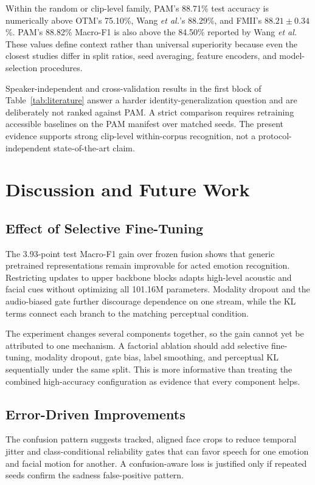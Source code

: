 \documentclass[conference]{IEEEtran}
\begin{document}
Within the random or clip-level family, PAM's 88.71\% test accuracy is
numerically above OTM's 75.10\%, Wang \emph{et al.}'s 88.29\%, and FMII's
$88.21\pm0.34$\%. PAM's 88.82\%
Macro-F1 is also above the 84.50\% reported by Wang \emph{et al.} These
values define context rather than universal superiority because even the
closest studies differ in split ratios, seed averaging, feature encoders, and
model-selection procedures.

Speaker-independent and cross-validation results in the first block of
Table~\ref{tab:literature} answer a harder identity-generalization question
and are deliberately not ranked against PAM. A strict comparison requires
retraining accessible baselines on the PAM manifest over matched seeds. The
present evidence supports strong clip-level within-corpus recognition, not a
protocol-independent state-of-the-art claim.

\section{Discussion and Future Work}
\label{sec:improvements}

\subsection{Effect of Selective Fine-Tuning}

The 3.93-point test Macro-F1 gain over frozen fusion shows that generic
pretrained representations remain improvable for acted emotion recognition.
Restricting updates to upper backbone blocks adapts high-level acoustic and
facial cues without optimizing all 101.16M parameters. Modality dropout and
the audio-biased gate further discourage dependence on one stream, while the
KL terms connect each branch to the matching perceptual condition.

The experiment changes several components together, so the gain cannot yet be
attributed to one mechanism. A factorial ablation should add selective
fine-tuning, modality dropout, gate bias, label smoothing, and perceptual KL
sequentially under the same split. This is more informative than treating the
combined high-accuracy configuration as evidence that every component helps.

\subsection{Error-Driven Improvements}

The confusion pattern suggests tracked, aligned face crops to reduce temporal
jitter and class-conditional reliability gates that can favor speech for one
emotion and facial motion for another. A confusion-aware loss is justified
only if repeated seeds confirm the sadness false-positive pattern.
\end{document}
